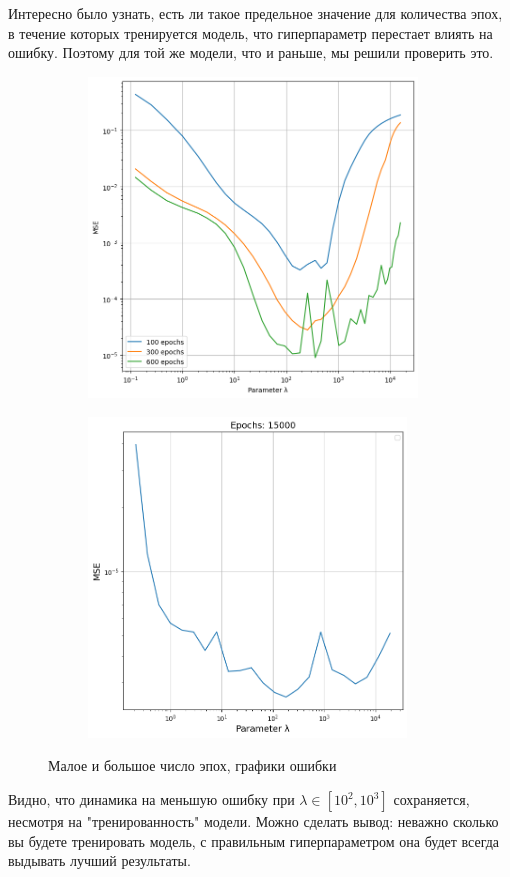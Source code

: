 Интересно было узнать, есть ли такое предельное значение для количества эпох, в течение которых тренируется модель, 
что гиперпараметр перестает влиять на ошибку. Поэтому для той же модели, что и раньше, мы решили проверить это.

\begin{figure}[ht!]
    \centering
    \begin{subfigure}{0.45\textwidth}{
        \includegraphics[height=8.5cm, keepaspectratio]{images/7.png}
    }
    \end{subfigure}
    \hfill
    \begin{subfigure}{0.45\textwidth}{
        \includegraphics[height=8.5cm, keepaspectratio]{images/1.png}
    }
    \end{subfigure}
    \caption{Малое и большое число эпох, графики ошибки}
\end{figure}

Видно, что динамика на меньшую ошибку при $\lambda \in [10^2, 10^3]$ сохраняется, несмотря на "тренированность" модели.
Можно сделать $\textbf{вывод}$: неважно сколько вы будете тренировать модель, с правильным гиперпараметром она будет всегда выдывать лучший результаты.

